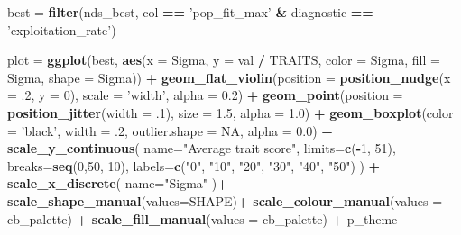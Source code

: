 \documentclass[]{book}
\newenvironment{Shaded}{\begin{snugshade}}{\end{snugshade}}
\newcommand{\DataTypeTok}[1]{\textcolor[rgb]{0.13,0.29,0.53}{#1}}
\newcommand{\DecValTok}[1]{\textcolor[rgb]{0.00,0.00,0.81}{#1}}
\newcommand{\FloatTok}[1]{\textcolor[rgb]{0.00,0.00,0.81}{#1}}
\newcommand{\KeywordTok}[1]{\textcolor[rgb]{0.13,0.29,0.53}{\textbf{#1}}}
\newcommand{\NormalTok}[1]{#1}
\newcommand{\OperatorTok}[1]{\textcolor[rgb]{0.81,0.36,0.00}{\textbf{#1}}}
\newcommand{\OtherTok}[1]{\textcolor[rgb]{0.56,0.35,0.01}{#1}}
\newcommand{\StringTok}[1]{\textcolor[rgb]{0.31,0.60,0.02}{#1}}
\begin{document}
\begin{Shaded}
\begin{Highlighting}[]
\NormalTok{best =}\StringTok{ }\KeywordTok{filter}\NormalTok{(nds_best, col }\OperatorTok{==}\StringTok{ 'pop_fit_max'} \OperatorTok{&}\StringTok{ }\NormalTok{diagnostic }\OperatorTok{==}\StringTok{ 'exploitation_rate'}\NormalTok{)}

\NormalTok{plot =}\StringTok{ }\KeywordTok{ggplot}\NormalTok{(best, }\KeywordTok{aes}\NormalTok{(}\DataTypeTok{x =}\NormalTok{ Sigma, }\DataTypeTok{y =}\NormalTok{ val }\OperatorTok{/}\StringTok{ }\NormalTok{TRAITS, }\DataTypeTok{color =}\NormalTok{ Sigma, }\DataTypeTok{fill =}\NormalTok{ Sigma, }\DataTypeTok{shape =}\NormalTok{ Sigma)) }\OperatorTok{+}
\StringTok{  }\KeywordTok{geom_flat_violin}\NormalTok{(}\DataTypeTok{position =} \KeywordTok{position_nudge}\NormalTok{(}\DataTypeTok{x =} \FloatTok{.2}\NormalTok{, }\DataTypeTok{y =} \DecValTok{0}\NormalTok{), }\DataTypeTok{scale =} \StringTok{'width'}\NormalTok{, }\DataTypeTok{alpha =} \FloatTok{0.2}\NormalTok{) }\OperatorTok{+}
\StringTok{  }\KeywordTok{geom_point}\NormalTok{(}\DataTypeTok{position =} \KeywordTok{position_jitter}\NormalTok{(}\DataTypeTok{width =} \FloatTok{.1}\NormalTok{), }\DataTypeTok{size =} \FloatTok{1.5}\NormalTok{, }\DataTypeTok{alpha =} \FloatTok{1.0}\NormalTok{) }\OperatorTok{+}
\StringTok{  }\KeywordTok{geom_boxplot}\NormalTok{(}\DataTypeTok{color =} \StringTok{'black'}\NormalTok{, }\DataTypeTok{width =} \FloatTok{.2}\NormalTok{, }\DataTypeTok{outlier.shape =} \OtherTok{NA}\NormalTok{, }\DataTypeTok{alpha =} \FloatTok{0.0}\NormalTok{) }\OperatorTok{+}
\StringTok{  }\KeywordTok{scale_y_continuous}\NormalTok{(}
    \DataTypeTok{name=}\StringTok{"Average trait score"}\NormalTok{,}
    \DataTypeTok{limits=}\KeywordTok{c}\NormalTok{(}\OperatorTok{-}\DecValTok{1}\NormalTok{, }\DecValTok{51}\NormalTok{),}
    \DataTypeTok{breaks=}\KeywordTok{seq}\NormalTok{(}\DecValTok{0}\NormalTok{,}\DecValTok{50}\NormalTok{, }\DecValTok{10}\NormalTok{),}
    \DataTypeTok{labels=}\KeywordTok{c}\NormalTok{(}\StringTok{"0"}\NormalTok{, }\StringTok{"10"}\NormalTok{, }\StringTok{"20"}\NormalTok{, }\StringTok{"30"}\NormalTok{, }\StringTok{"40"}\NormalTok{, }\StringTok{"50"}\NormalTok{)}
\NormalTok{  ) }\OperatorTok{+}
\StringTok{  }\KeywordTok{scale_x_discrete}\NormalTok{(}
    \DataTypeTok{name=}\StringTok{"Sigma"}
\NormalTok{  )}\OperatorTok{+}
\StringTok{  }\KeywordTok{scale_shape_manual}\NormalTok{(}\DataTypeTok{values=}\NormalTok{SHAPE)}\OperatorTok{+}
\StringTok{  }\KeywordTok{scale_colour_manual}\NormalTok{(}\DataTypeTok{values =}\NormalTok{ cb_palette) }\OperatorTok{+}
\StringTok{  }\KeywordTok{scale_fill_manual}\NormalTok{(}\DataTypeTok{values =}\NormalTok{ cb_palette) }\OperatorTok{+}
\StringTok{  }\NormalTok{p_theme}


\end{Highlighting}
\end{Shaded}
\end{document}
